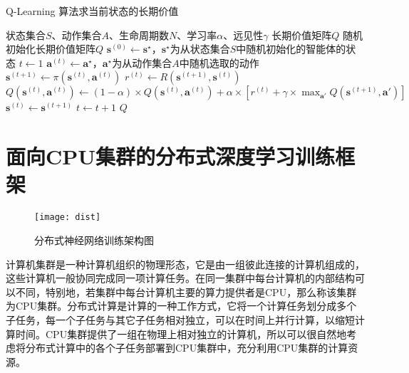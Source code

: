 \begin{algorithm}
    \caption{Q-Learning 算法求当前状态的长期价值}
    \label{alg:qlearning}
    \begin{algorithmic}[1]
        \Require 状态集合$S$、动作集合$A$、生命周期数$N$、学习率$\alpha$、远见性$\gamma$
        \Ensure 长期价值矩阵$Q$
            \State 随机初始化长期价值矩阵$Q$
                \State $\boldsymbol{s}^{(0)}\gets\boldsymbol{s}^\star$，$\boldsymbol{s}^\star$为从状态集合$S$中随机初始化的智能体的状态
                \State $t\gets1$
                \Repeat
                    \State $\boldsymbol{a}^{(t)}\gets \boldsymbol{a}^\star$，$\boldsymbol{a}^\star$为从动作集合$A$中随机选取的动作
                    \State $\boldsymbol{s}^{(t+1)}\gets \pi\left(\boldsymbol{s}^{(t)}, \boldsymbol{a}^{(t)}\right)$
                    \State $r^{(t)}\gets R\left(\boldsymbol{s}^{(t+1)},\boldsymbol{s}^{(t)}\right)$
                    \State $Q\left(\boldsymbol{s}^{(t)},\boldsymbol{a}^{(t)}\right)\gets(1-\alpha)\times Q\left(\boldsymbol{s}^{(t)},\boldsymbol{a}^{(t)}\right)+\alpha\times\left[r^{(t)}+\gamma\times\max_{\boldsymbol{a}'}Q\left(\boldsymbol{s}^{(t+1)}, \boldsymbol{a}'\right)\right]$
                    \State $\boldsymbol{s}^{(t)}\gets\boldsymbol{s}^{(t+1)}$
                    \State $t\gets  t+1$
            \EndFor
            \State\Return $Q$
        \EndFunction
    \end{algorithmic}
\end{algorithm}

\section{面向CPU集群的分布式深度学习训练框架}

\begin{figure}
\centering
\texttt{[image: dist]}
\caption{分布式神经网络训练架构图}
\label{fig:dist}
\end{figure}

计算机集群是一种计算机组织的物理形态，它是由一组彼此连接的计算机组成的，这些计算机一般协同完成同一项计算任务。在同一集群中每台计算机的内部结构可以不同，特别地，若集群中每台计算机主要的算力提供者是CPU，那么称该集群为CPU集群。分布式计算是计算的一种工作方式，它将一个计算任务划分成多个子任务，每一个子任务与其它子任务相对独立，可以在时间上并行计算，以缩短计算时间。CPU集群提供了一组在物理上相对独立的计算机，所以可以很自然地考虑将分布式计算中的各个子任务部署到CPU集群中，充分利用CPU集群的计算资源。

